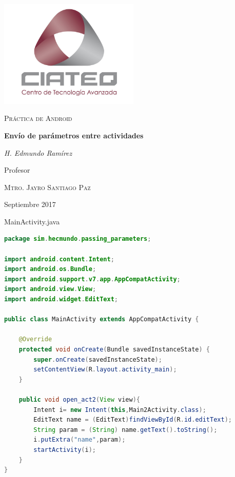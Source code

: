 \documentclass{report}
\begin{document}

\begin{titlepage}

	\centering
	\includegraphics[width=0.5\textwidth]{../images/ciateq.jpg}\par\vspace{1cm}
	\vspace{1cm}
	{\scshape\Large Pr\'{a}ctica de Android\par}
	\vspace{1.5cm}
	{\huge\bfseries Env\'{i}o de par\'{a}metros entre actividades\par}
	\vspace{2cm}
	{\Large\itshape H. Edmundo Ram\'{i}rez\par}
	\vfill
	Profesor\par
	\textsc{Mtro. Jayro Santiago Paz}
	\vfill

	{\large \date sSeptiembre 2017\par}
\end{titlepage}

MainActivity.java
\begin{lstlisting}[language=java]
package sim.hecmundo.passing_parameters;

import android.content.Intent;
import android.os.Bundle;
import android.support.v7.app.AppCompatActivity;
import android.view.View;
import android.widget.EditText;

public class MainActivity extends AppCompatActivity {

    @Override
    protected void onCreate(Bundle savedInstanceState) {
        super.onCreate(savedInstanceState);
        setContentView(R.layout.activity_main);
    }

    public void open_act2(View view){
        Intent i= new Intent(this,Main2Activity.class);
        EditText name = (EditText)findViewById(R.id.editText);
        String param = (String) name.getText().toString();
        i.putExtra("name",param);
        startActivity(i);
    }
}
\end{lstlisting}	
\end{document}
